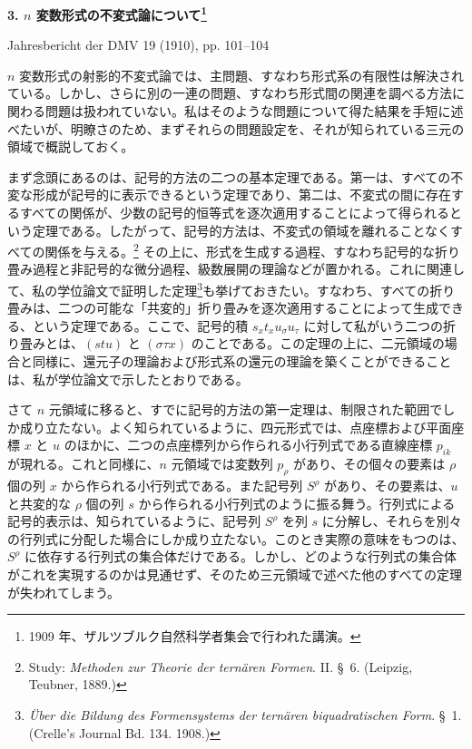 \documentclass[11pt]{article}
\newcommand{\pair}[2]{(#1\,|\,#2)}
\newcommand{\eps}{\varepsilon}
\begin{document}
\clearpage

\providecommand{\pair}[2]{(#1\,|\,#2)}
\providecommand{\eps}{\varepsilon}
\providecommand{\rhoidx}{\varrho}

\begin{center}
{\Large\bfseries 3. $n$ 変数形式の不変式論について\footnote{1909 年、ザルツブルク自然科学者集会で行われた講演。}}\par
\vspace{1.2em}
Jahresbericht der DMV 19 (1910), pp. 101--104
\end{center}

\vspace{1em}
$n$ 変数形式の射影的不変式論では、主問題、すなわち形式系の有限性は解決されている。しかし、さらに別の一連の問題、すなわち形式間の関連を調べる方法に関わる問題は扱われていない。私はそのような問題について得た結果を手短に述べたいが、明瞭さのため、まずそれらの問題設定を、それが知られている三元の領域で概説しておく。

まず念頭にあるのは、記号的方法の二つの基本定理である。第一は、すべての不変な形成が記号的に表示できるという定理であり、第二は、不変式の間に存在するすべての関係が、少数の記号的恒等式を逐次適用することによって得られるという定理である。したがって、記号的方法は、不変式の領域を離れることなくすべての関係を与える。\footnote{Study: \emph{Methoden zur Theorie der ternären Formen}. II. \S\ 6. (Leipzig, Teubner, 1889.)} その上に、形式を生成する過程、すなわち記号的な折り畳み過程と非記号的な微分過程、級数展開の理論などが置かれる。これに関連して、私の学位論文で証明した定理\footnote{\emph{Über die Bildung des Formensystems der ternären biquadratischen Form}. \S\ 1. (Crelle's Journal Bd. 134. 1908.)}も挙げておきたい。すなわち、すべての折り畳みは、二つの可能な「共変的」折り畳みを逐次適用することによって生成できる、という定理である。ここで、記号的積 $s_x t_x u_\sigma u_\tau$ に対して私がいう二つの折り畳みとは、$(stu)$ と $(\sigma\tau x)$ のことである。この定理の上に、二元領域の場合と同様に、還元子の理論および形式系の還元の理論を築くことができることは、私が学位論文で示したとおりである。

さて $n$ 元領域に移ると、すでに記号的方法の第一定理は、制限された範囲でしか成り立たない。よく知られているように、四元形式では、点座標および平面座標 $x$ と $u$ のほかに、二つの点座標列から作られる小行列式である直線座標 $p_{ik}$ が現れる。これと同様に、$n$ 元領域では変数列 $p_\rho$ があり、その個々の要素は $\rho$ 個の列 $x$ から作られる小行列式である。また記号列 $S^\rho$ があり、その要素は、$u$ と共変的な $\rho$ 個の列 $s$ から作られる小行列式のように振る舞う。行列式による記号的表示は、知られているように、記号列 $S^\rho$ を列 $s$ に分解し、それらを別々の行列式に分配した場合にしか成り立たない。このとき実際の意味をもつのは、$S^\rho$ に依存する行列式の集合体だけである。しかし、どのような行列式の集合体がこれを実現するのかは見通せず、そのため三元領域で述べた他のすべての定理が失われてしまう。
\end{document}
